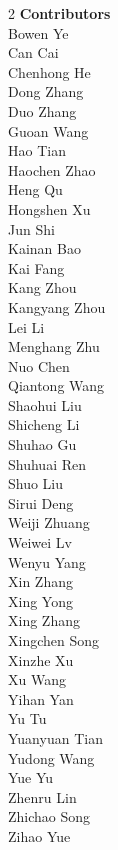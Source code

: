 \documentclass[11pt, a4paper, logo, copyright, nonumbering]{xiaomi}
\begin{document}
\begin{multicols}{2}
\noindent
\textbf{\color{ourblue} Contributors} \\
\color{ourblue} 
\color{ourblue} Bowen Ye \\
\color{ourblue} Can Cai \\
\color{ourblue} Chenhong He \\
\color{ourblue} Dong Zhang \\
\color{ourblue} Duo Zhang \\
\color{ourblue} Guoan Wang \\
\color{ourblue} Hao Tian \\
\color{ourblue} Haochen Zhao \\
\color{ourblue} Heng Qu \\
\color{ourblue} Hongshen Xu \\
\color{ourblue} Jun Shi \\
\color{ourblue} Kainan Bao \\
\color{ourblue} Kai Fang \\
\color{ourblue} Kang Zhou \\
\color{ourblue} Kangyang Zhou \\
\color{ourblue} Lei Li \\
\color{ourblue} Menghang Zhu \\
\color{ourblue} Nuo Chen \\
\color{ourblue} Qiantong Wang \\
\color{ourblue} Shaohui Liu \\
\color{ourblue} Shicheng Li \\
\color{ourblue} Shuhao Gu \\
\color{ourblue} Shuhuai Ren \\
\color{ourblue} Shuo Liu \\
\color{ourblue} Sirui Deng \\
\color{ourblue} Weiji Zhuang \\
\color{ourblue} Weiwei Lv \\
\color{ourblue} Wenyu Yang \\
\color{ourblue} Xin Zhang \\
\color{ourblue} Xing Yong \\
\color{ourblue} Xing Zhang \\
\color{ourblue} Xingchen Song \\
\color{ourblue} Xinzhe Xu \\
\color{ourblue} Xu Wang \\
\color{ourblue} Yihan Yan \\
\color{ourblue} Yu Tu \\
\color{ourblue} Yuanyuan Tian \\
\color{ourblue} Yudong Wang \\
\color{ourblue} Yue Yu \\
\color{ourblue} Zhenru Lin \\
\color{ourblue} Zhichao Song \\
\color{ourblue} Zihao Yue \\

\end{multicols} %

\end{document}
